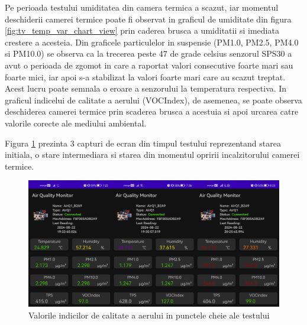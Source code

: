 Pe perioada testului umiditatea din camera termica a scazut, iar momentul deschiderii camerei termice poate fi observat in graficul de umiditate din figura 
\ref{fig:tv_temp_var_chart_view} prin caderea brusca a umiditatii si imediata crestere a acesteia. Din graficele particulelor in suspensie (PM1.0, PM2.5, PM4.0 si PM10.0) 
se observa ca la trecerea peste 47 de grade celsius senzorul SPS30 a avut o perioada de zgomot in care a raportat valori consecutive foarte mari sau foarte mici, iar apoi 
s-a stabilizat la valori foarte mari care au scazut treptat. Acest lucru poate semnala o eroare a senzorului la temperatura respectiva. In graficul indicelui de 
calitate a aerului (VOCIndex), de asemenea, se poate observa deschiderea camerei termice prin scaderea brusca a acestuia si apoi urcarea catre valorile corecte ale 
mediului ambiental. 

Figura \ref{fig:tv_temp_var_sensor_view} prezinta 3 capturi de ecran din timpul testului reprezentand starea initiala, o stare intermediara si starea din momentul 
opririi incalzitorului camerei termice. 
\begin{figure}[H]
    \centering
    \includegraphics[scale=0.16]{figs/tv_temp_var_sensor_view.png}
    \caption{Valorile indicilor de calitate a aerului in punctele cheie ale testului}
    \label{fig:tv_temp_var_sensor_view}
\end{figure}


